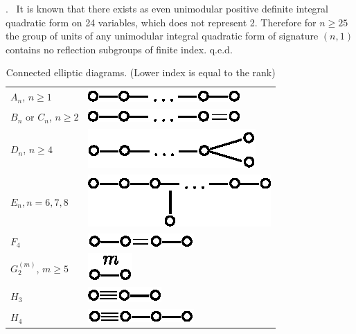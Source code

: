 .~ It is known \cite{art10-key5} that there exists as even unimodular positive definite integral quadratic form on 24 variables, which does not represent 2. Therefore for $n \geqslant 25$ the group of units of any unimodular integral quadratic form of signature $(n,1)$ contains no reflection subgroups of finite index. q.e.d.
\begin{table}[H]
\renewcommand{\arraystretch}{1.1}
\tabcolsep=10pt
\setcounter{table}{0}
\begin{longtable}{@{}l@{\quad}l@{}}
\caption{Connected elliptic diagrams. (Lower index is equal to the rank)}\label{art10-table-1}\\
$A_n$, $n  \geqslant 1$ & {\includegraphics{344a.eps}}\\
$B_n$ or $C_n$, $n \geqslant 2$ & {\includegraphics{344b.eps}}\\
$D_n $, $n \geqslant 4$ & {\includegraphics{344c.eps}}\\
$E_n, n = 6, 7, 8$ & {\includegraphics{344d.eps}}\\
$F_4$ & {\includegraphics{344e.eps}}\\
$G^{(m)}_2$, $m \geqslant 5$ & {\includegraphics{344f.eps}}\\
$H_3$ & {\includegraphics{344g.eps}}\\
$H_4$ & {\includegraphics{344h.eps}}
\end{longtable}
\end{table}\pageoriginale


